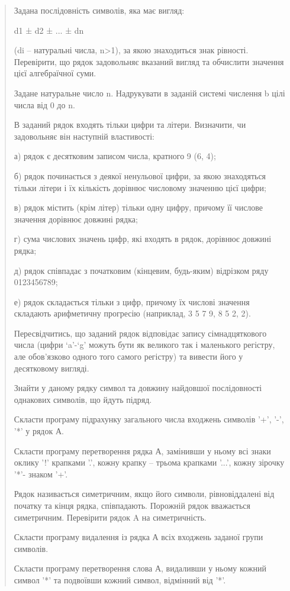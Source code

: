 \documentclass[]{article}
\begin{document}
\begin{quote}
Задана послідовність символів, яка має вигляд:

d1 ± d2 ± ... ± dn

(di -- натуральні числа, n\textgreater{}1), за якою знаходиться знак
рівності. Перевірити, що рядок задовольняє вказаний вигляд та обчислити
значення цієї алгебраїчної суми.

Задане натуральне число n. Надрукувати в заданій системі числення b цілі
числа від 0 до n.

В заданий рядок входять тільки цифри та літери. Визначити, чи
задовольняє він наступній властивості:

а) рядок є десятковим записом числа, кратного 9 (6, 4);

б) рядок починається з деякої ненульової цифри, за якою знаходяться
тільки літери і їх кількість дорівнює числовому значенню цієї цифри;

в) рядок містить (крім літер) тільки одну цифру, причому її числове
значення дорівнює довжині рядка;

г) сума числових значень цифр, які входять в рядок, дорівнює довжині
рядка;

д) рядок співпадає з початковим (кінцевим, будь-яким) відрізком ряду
0123456789;

е) рядок складається тільки з цифр, причому їх числові значення
складають арифметичну прогресію (наприклад, 3 5 7 9, 8 5 2, 2).

Пересвідчитись, що заданий рядок відповідає запису сімнадцяткового числа
(цифри `a'-`g' можуть бути як великого так і маленького регістру, але
обов'язково одного того самого регістру) та вивести його у десятковому
вигляді.

Знайти у даному рядку символ та довжину найдовшої послідовності
однакових символів, що йдуть підряд.

Скласти програму підрахунку загального числа входжень символів '+', '-',
'*' у рядок А.

Скласти програму перетворення рядка А, замінивши у ньому всі знаки
оклику '!' крапками '.', кожну крапку -- трьома крапками '...', кожну
зірочку '*'- знаком '+'.

Рядок називається симетричним, якщо його символи, рівновіддалені від
початку та кінця рядка, співпадають. Порожній рядок вважається
симетричним. Перевірити рядок A на симетричність.

Скласти програму видалення із рядка А всіх входжень заданої групи
символів.

Скласти програму перетворення слова А, видаливши у ньому кожний символ
'*' та подвоївши кожний символ, відмінний від '*'.


\end{quote}
\end{document}
